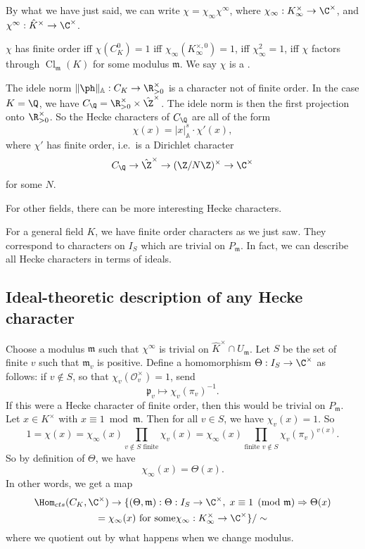 \documentclass[a4paper]{article}
\newcommand\A{\mathbb{A}}
\DeclareMathOperator\Cl{\mathrm{Cl}}
\begin{document}
By what we have just said, we can write $\chi = \chi_\infty \chi^\infty$, where $\chi_\infty: K_\infty^\times \to \C^\times$, and $\chi^\infty: \hat{K}^\times \to \C^\times$.

\begin{eg}
  $\chi$ has finite order iff $\chi(C_K^0) = 1$ iff $\chi_\infty(K_\infty^{\times, 0}) = 1$, iff $\chi_\infty^2 = 1$, iff $\chi$ factors through $\Cl_\mathfrak{m}(K)$ for some modulus $\mathfrak{m}$. We say $\chi$ is a .
\end{eg}

\begin{eg}
  The idele norm $\|\ph\|_{\A}: C_K \to \R^\times_{>0}$ is a character not of finite order. In the case $K = \Q$, we have $C_\Q = \R_{>0}^\times \times \hat{\Z}^\times$. The idele norm is then the first projection onto $\R_{>0}^\times$. So the Hecke characters of $C_\Q$ are all of the form
  \[
    \chi(x) = |x|_{\A}^s \cdot \chi'(x),
  \]
  where $\chi'$ has finite order, i.e.\ is a Dirichlet character
  \[
    C_\Q \to \hat{\Z}^\times \to (\Z/N\Z)^\times \to \C^\times
  \]
  for some $N$.
\end{eg}
For other fields, there can be more interesting Hecke characters.

For a general field $K$, we have finite order characters as we just saw. They correspond to characters on $I_S$ which are trivial on $P_\mathfrak{m}$. In fact, we can describe all Hecke characters in terms of ideals.

\subsection{Ideal-theoretic description of any Hecke character}
Choose a modulus $\mathfrak{m}$ such that $\chi^\infty$ is trivial on $\hat{K}^\times \cap U_\mathfrak{m}$. Let $S$ be the set of finite $v$ such that $\mathfrak{m}_v$ is positive. Define a homomorphism $\Theta: I_S \to \C^\times$ as follows: if $v \not \in S$, so that $\chi_v(\mathcal{O}_v^\times) = 1$, send
\[
  \mathfrak{p}_v \mapsto \chi_v(\pi_v)^{-1}.
\]
If this were a Hecke character of finite order, then this would be trivial on $P_\mathfrak{m}$. Let $x \in K^\times$ with $x \equiv 1 \bmod{\mathfrak{m}}$. Then for all $v \in S$, we have $\chi_v(x) = 1$. So
\[
  1 = \chi(x) = \chi_\infty(x) \prod_{v \not \in S\text{ finite}} \chi_v(x) = \chi_\infty(x) \prod_{\text{finite }v \not \in S} \chi_v(\pi_v)^{v(x)}.
\]
So by definition of $\Theta$, we have
\[
  \chi_\infty(x) = \Theta(x).
\]
In other words, we get a map
\begin{multline*}
  \Hom_{cts}(C_K, \C^\times) \to \{(\Theta, \mathfrak{m}) : \Theta: I_S \to \C^\times, \;x \equiv 1 \pmod {\mathfrak{m}} \Rightarrow \Theta(x) \\
  = \chi_\infty(x)\text{ for some}\chi_\infty: K_\infty^\times \to \C^\times\}/\sim
\end{multline*}
where we quotient out by what happens when we change modulus.
\end{document}
